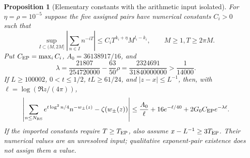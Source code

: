 \documentclass[11pt]{article}
\numberwithin{equation}{section}
\newtheorem{proposition}[theorem]{Proposition}
\theoremstyle{definition}
\theoremstyle{remark}
\begin{document}
\begin{proposition}[Elementary constants with the arithmetic input isolated]
\label{upd:explicit-weighted-budget}
For $\eta=\rho=10^{-5}$ suppose the five assigned pairs have numerical
constants $C_i>0$ such that
\[
 \sup_{I\subset(M,2M]}\left|\sum_{n\in I}n^{-iT}\right|
 \le C_iT^{k_i+\eta}M^{l_i-k_i},\qquad M\ge1, T\ge2\pi M.
\]
Put $C_{\rm EP}=\max_iC_i$,
$A_0=36138917/16$, and
\[
 \lambda=\frac{21807}{254720000}-\frac{63}{50}\rho
        =\frac{2324691}{31840000000}>\frac1{14000}.
\]
If $L\ge100002$, $0<t\le1/2$, $tL\ge61/24$, and
$|z-x|\le L^{-1}$, then, with $\ell=\log(\Re z/(4\pi))$,
\begin{equation}
 \left|\sum_{n\le N_{\rm RS}}e^{t\log^2n/4}n^{-w_\pm(z)}
                      -\zeta(w_\pm(z))\right|
 \le\frac{A_0}{\ell}+16e^{-\ell/40}
                    +2G_0C_{\rm EP}e^{-\lambda\ell}.
 \label{upd:explicit-sum}
\end{equation}
If the imported constants require $T\ge T_{\rm EP}$, also assume
$x-L^{-1}\ge3T_{\rm EP}$.  Their numerical values are an unresolved
input; qualitative exponent-pair existence does not assign them a value.
\end{proposition}
\end{document}
